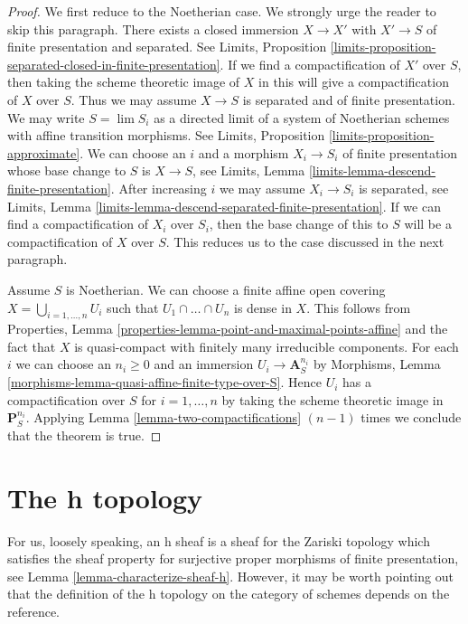 \begin{proof}
We first reduce to the Noetherian case. We strongly urge the reader
to skip this paragraph. There exists a closed immersion
$X \to X'$ with $X' \to S$ of finite presentation and separated.
See Limits, Proposition
\ref{limits-proposition-separated-closed-in-finite-presentation}.
If we find a compactification of $X'$ over $S$, then
taking the scheme theoretic image of $X$ in this will give
a compactification of $X$ over $S$. Thus we may assume
$X \to S$ is separated and of finite presentation.
We may write $S = \lim S_i$ as a directed
limit of a system of Noetherian schemes with affine transition morphisms.
See Limits, Proposition \ref{limits-proposition-approximate}.
We can choose an $i$ and a morphism $X_i \to S_i$ of finite
presentation whose base change to $S$ is $X \to S$, see
Limits, Lemma \ref{limits-lemma-descend-finite-presentation}.
After increasing $i$ we may assume $X_i \to S_i$ is separated, see
Limits, Lemma \ref{limits-lemma-descend-separated-finite-presentation}.
If we can find a compactification of $X_i$ over $S_i$, then the
base change of this to $S$ will be a compactification of $X$ over $S$.
This reduces us to the case discussed in the next paragraph.

\medskip\noindent
Assume $S$ is Noetherian. We can choose a finite affine open covering
$X = \bigcup_{i = 1, \ldots, n} U_i$ such that $U_1 \cap \ldots \cap U_n$
is dense in $X$. This follows from
Properties, Lemma \ref{properties-lemma-point-and-maximal-points-affine}
and the fact that $X$ is quasi-compact with finitely many
irreducible components. For each $i$ we can choose an $n_i \geq 0$ and an
immersion $U_i \to \mathbf{A}^{n_i}_S$ by
Morphisms, Lemma \ref{morphisms-lemma-quasi-affine-finite-type-over-S}.
Hence $U_i$ has a compactification over $S$ for $i = 1, \ldots, n$
by taking the scheme theoretic image in $\mathbf{P}^{n_i}_S$.
Applying Lemma \ref{lemma-two-compactifications}
$(n - 1)$ times we conclude that the theorem is true.
\end{proof}






\section{The h topology}
\label{section-h}

\noindent
For us, loosely speaking, an h sheaf is a sheaf for the Zariski topology
which satisfies the sheaf property for surjective proper morphisms
of finite presentation, see Lemma \ref{lemma-characterize-sheaf-h}.
However, it may be worth pointing out that the definition of the h topology
on the category of schemes depends on the reference.

